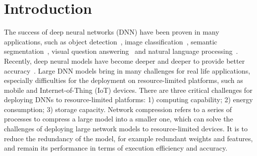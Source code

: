 \section{Introduction}\label{sec:intro}
The success of deep neural networks (DNN) have been proven in many applications, such as object detection~\citep{liu2016ssd,ren2015faster,girshick2015fast}, image classification~\citep{he2016deep,szegedy2015going,simonyan2014vgg,krizhevsky2012imagenet}, semantic segmentation~\citep{noh2015learning,pohlen2017full,girshick2014rich,long2015fcn}, visual question answering~\cite{noh2016image,malinowski2015ask} and natural language processing~\citep{graves2013speech}.
Recently, deep neural models have become deeper and deeper to provide better accuracy~\cite{resnet,googlenet,mobilent}.
Large DNN models bring in many challenges for real life applications, especially difficulties for the deployment on resource-limited platforms, such as mobile and Internet-of-Thing (IoT) devices. There are three critical challenges for deploying DNNs to resource-limited platforms: 1) computing capability; 2) energy consumption; 3) storage capacity.
Network compression refers to a series of processes to compress a large model into a smaller one, which can solve the challenges of deploying large network models to resource-limited devices.
It is to reduce the redundancy of the model, for example redundant weights and features, and remain its performance in terms of execution efficiency and accuracy. 

